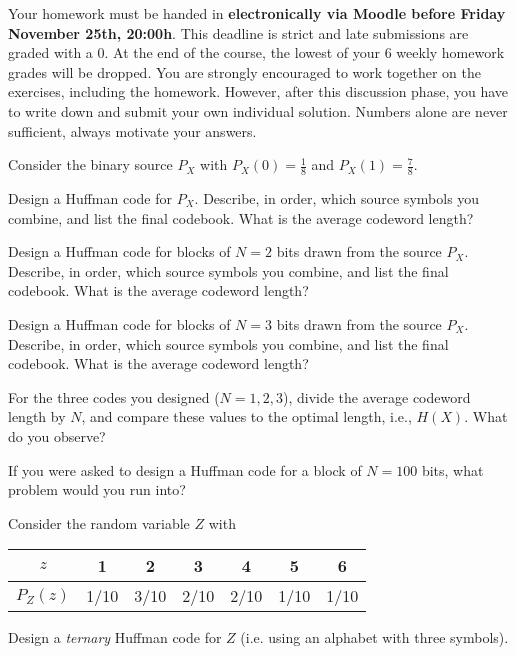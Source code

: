 \documentclass[a4paper,10pt,landscape,twocolumn]{scrartcl}
\newcommand\deadline{Friday November 25th, 20:00h}
\begin{document}
\homeworkproblems

{\sffamily\noindent
Your homework must be handed in \textbf{electronically via Moodle before \deadline}. This deadline is strict and late submissions are graded with a 0. At the end of the course, the lowest of your 6 weekly homework grades will be dropped. You are strongly encouraged to work together on the exercises, including the homework. However, after this discussion phase, you have to write down and submit your own individual solution. Numbers alone are never sufficient, always motivate your answers.
}


\begin{exercise}
	\begin{subex}[(4pt)]
    Consider the binary source $P_X$ with $P_X(0) = \frac{1}{8}$ and $P_X(1) = \frac{7}{8}$.
    
    Design a Huffman code for $P_X$. Describe, in order, which source symbols you combine, and list the final codebook. What is the average codeword length?
	\end{subex}
\begin{subex}[(4pt)]
	Design a Huffman code for blocks of $N=2$ bits drawn from the source $P_X$. Describe, in order, which source symbols you combine, and list the final codebook. What is the average codeword length?
\end{subex}
\begin{subex}[(4pt)]
	Design a Huffman code for blocks of $N=3$ bits drawn from the source $P_X$. Describe, in order, which source symbols you combine, and list the final codebook. What is the average codeword length?
\end{subex}
\begin{subex}[(4pt)]
	For the three codes you designed ($N=1,2,3$), divide the average codeword length by $N$, and compare these values to the optimal length, i.e., $H(X)$. What do you observe?
\end{subex}
	\begin{subex}[(1pt)]
	If you were asked to design a Huffman code for a block of $N = 100$ bits, what problem would you run into?
	\end{subex}
	\begin{subex}[(2pt)]
	Consider the random variable $Z$ with
	\begin{center}
	\begin{tabular}{c | c c c c c c}
	$z$ & 1 & 2 & 3 & 4 & 5 & 6\\
	\hline
	$P_Z(z)$ & 1/10 & 3/10 & 2/10 & 2/10 & 1/10 & 1/10\\
	\end{tabular}
	\end{center}
	Design a \emph{ternary} Huffman code for $Z$ (i.e. using an alphabet with three symbols).
	\end{subex}
\end{exercise}
\end{document}
